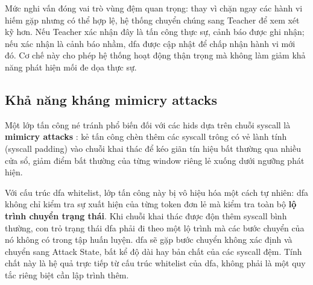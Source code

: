 \documentclass[../main.tex]{subfiles}
\begin{document}
\begin{table}[H]
  \caption{Ba mức phản ứng của chương trình eBPF tại runtime.}
  \label{tab:categorical_response}
  \centering
\end{table}

Mức nghi vấn đóng vai trò vùng đệm quan trọng: thay vì chặn ngay các
hành vi hiếm gặp
nhưng có thể hợp lệ, hệ thống chuyển chúng sang Teacher để xem xét kỹ
hơn. Nếu Teacher
xác nhận đây là tấn công thực sự, cảnh báo được ghi nhận; nếu xác
nhận là cảnh báo nhầm,
\gls{dfa} được cập nhật để chấp nhận hành vi mới đó. Cơ chế này cho phép hệ
thống hoạt động
thận trọng mà không làm giảm khả năng phát hiện mối đe dọa thực sự.

\subsection{Khả năng kháng mimicry attacks}
\label{sec:mimicry}

Một lớp tấn công né tránh phổ biến đối với các \gls{hids} dựa trên
chuỗi \gls{syscall} là
\textbf{mimicry attacks}
\cite{forrest1996sense,grimmer2022improving,wagner2002mimicry}: kẻ
tấn công chèn thêm các \gls{syscall}
trông có vẻ lành tính (\gls{syscall} padding) vào chuỗi khai thác để kéo
giãn tín hiệu bất
thường qua nhiều cửa sổ, giảm điểm bất thường của từng window riêng
lẻ xuống dưới ngưỡng
phát hiện.

Với cấu trúc \gls{dfa} whitelist, lớp tấn công này bị vô hiệu hóa một cách
tự nhiên: \gls{dfa} không
chỉ kiểm tra sự xuất hiện của từng token đơn lẻ mà kiểm tra toàn bộ
\textbf{lộ trình
chuyển trạng thái}. Khi chuỗi khai thác được độn thêm \gls{syscall} bình
thường, con trỏ
trạng thái \gls{dfa} phải đi theo một lộ trình mà các bước chuyển của nó
không có trong tập
huấn luyện. \Gls{dfa} sẽ gặp bước chuyển không xác định và chuyển sang
Attack State, bất
kể độ dài hay bản chất của các \gls{syscall} đệm. Tính chất này là hệ quả
trực tiếp từ cấu
trúc whitelist của \gls{dfa}, không phải là một quy tắc riêng biệt
cần lập trình thêm.
\end{document}
